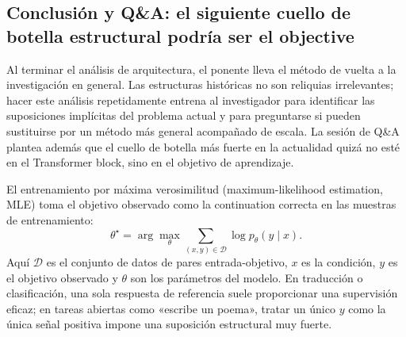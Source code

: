 
\subsection{Conclusión y Q\&A: el siguiente cuello de botella estructural podría ser el objective}

Al terminar el análisis de arquitectura, el ponente lleva el método de vuelta a la investigación en general. Las estructuras históricas no son reliquias irrelevantes; hacer este análisis repetidamente entrena al investigador para identificar las suposiciones implícitas del problema actual y para preguntarse si pueden sustituirse por un método más general acompañado de escala. La sesión de Q\&A plantea además que el cuello de botella más fuerte en la actualidad quizá no esté en el Transformer block, sino en el objetivo de aprendizaje.



El entrenamiento por máxima verosimilitud (maximum-likelihood estimation, MLE) toma el objetivo observado como la continuation correcta en las muestras de entrenamiento:
\[
\theta^{\star}=\arg\max_{\theta}\sum_{(x,y)\in\mathcal{D}}\log p_{\theta}(y\mid x).
\]
Aquí $\mathcal{D}$ es el conjunto de datos de pares entrada-objetivo, $x$ es la condición, $y$ es el objetivo observado y $\theta$ son los parámetros del modelo. En traducción o clasificación, una sola respuesta de referencia suele proporcionar una supervisión eficaz; en tareas abiertas como «escribe un poema», tratar un único $y$ como la única señal positiva impone una suposición estructural muy fuerte.

